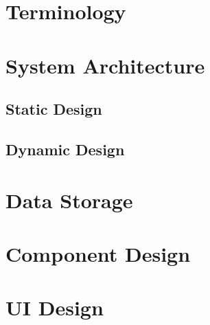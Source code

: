 \documentclass[11pt,letterpaper]{article}
\begin{document}
\section{Terminology}

\section{System Architecture}
\subsection{Static Design}
\subsection{Dynamic Design}

\section{Data Storage}

\section{Component Design}

\section{UI Design}



\end{document}

